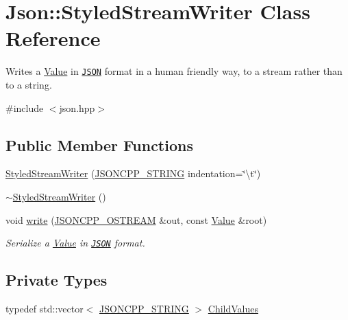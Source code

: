 \hypertarget{classJson_1_1StyledStreamWriter}{}\section{Json\+:\+:Styled\+Stream\+Writer Class Reference}
\label{classJson_1_1StyledStreamWriter}


Writes a \hyperlink{classJson_1_1Value}{Value} in \href{http://www.json.org}{\tt J\+S\+ON} format in a human friendly way, to a stream rather than to a string.  




{\ttfamily \#include $<$json.\+hpp$>$}

\subsection*{Public Member Functions}
\begin{DoxyCompactItemize}
\item 
\hyperlink{classJson_1_1StyledStreamWriter_a71fe3b45a3a5fd6616d807ca99d1a1ef}{Styled\+Stream\+Writer} (\hyperlink{json_8hpp_a1e723f95759de062585bc4a8fd3fa4be}{J\+S\+O\+N\+C\+P\+P\+\_\+\+S\+T\+R\+I\+NG} indentation=\char`\"{}\textbackslash{}t\char`\"{})
\item 
\hyperlink{classJson_1_1StyledStreamWriter_a17444a59f617970279714e97b0ddfa46}{$\sim$\+Styled\+Stream\+Writer} ()
\item 
void \hyperlink{classJson_1_1StyledStreamWriter_a5d89d984fe675641e42c4370cd247774}{write} (\hyperlink{json_8hpp_a37a25be5fca174927780caeb280094ce}{J\+S\+O\+N\+C\+P\+P\+\_\+\+O\+S\+T\+R\+E\+AM} \&out, const \hyperlink{classJson_1_1Value}{Value} \&root)
\begin{DoxyCompactList}\small\item\em Serialize a \hyperlink{classJson_1_1Value}{Value} in \href{http://www.json.org}{\tt J\+S\+ON} format. \end{DoxyCompactList}\end{DoxyCompactItemize}
\subsection*{Private Types}
\begin{DoxyCompactItemize}
\item 
typedef std\+::vector$<$ \hyperlink{json_8hpp_a1e723f95759de062585bc4a8fd3fa4be}{J\+S\+O\+N\+C\+P\+P\+\_\+\+S\+T\+R\+I\+NG} $>$ \hyperlink{classJson_1_1StyledStreamWriter_a259bf9d99847b2ea64ec9c6dd441944e}{Child\+Values}
\end{DoxyCompactItemize}
